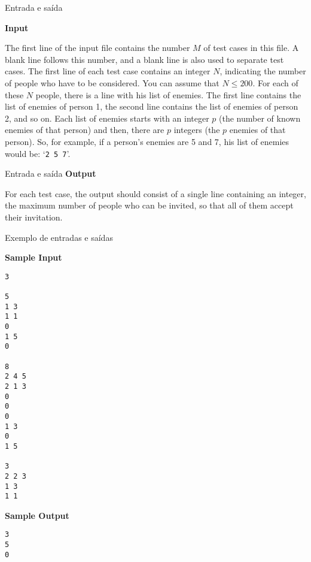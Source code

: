 \begin{frame}[fragile]{Entrada e saída}

\textbf{Input}

The first line of the input file contains the number $M$ of test cases in this file. A blank line 
follows this number, and a blank line is also used to separate test cases. The first line of each 
test case contains an integer $N$, indicating the number of people who have to be considered. You 
can assume that $N\leq 200$.  For each of these $N$ people, there is a line with his list of 
enemies. The first line contains the list of enemies of person 1, the second line contains the 
list of enemies of person 2, and so on. Each list of enemies starts with an integer $p$ (the number 
of known enemies of that person) and then, there are $p$ integers (the $p$ enemies of that person). 
So, for example, if a person’s enemies are 5 and 7, his list of enemies would be: ‘\texttt{2 5 7}’.

\end{frame}

\begin{frame}[fragile]{Entrada e saída}
\textbf{Output}

For each test case, the output should consist of a single line containing an integer, the maximum 
number of people who can be invited, so that all of them accept their invitation.

\end{frame}

\begin{frame}[fragile]{Exemplo de entradas e saídas}
\begin{scriptsize}
\begin{minipage}[t]{0.6\textwidth}
\textbf{Sample Input}
\begin{verbatim}
3

5
1 3
1 1
0
1 5
0

8
2 4 5
2 1 3
0
0
0
1 3
0
1 5

3
2 2 3
1 3
1 1
\end{verbatim}
\end{minipage}
\begin{minipage}[t]{0.35\textwidth}
\textbf{Sample Output}
\begin{verbatim}
3
5
0
\end{verbatim}
\end{minipage}
\end{scriptsize}
\end{frame}

